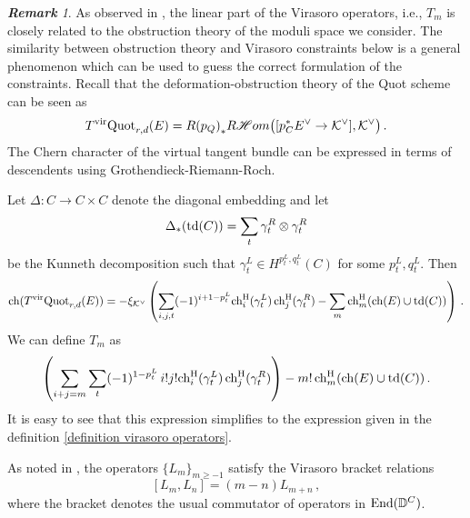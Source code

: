 \documentclass[11pt]{amsart}
\theoremstyle{remark}
\newtheorem{remark}[theorem]{\bf Remark}
\newcommand{\e}{\epsilon}
\newcommand{\ch}{{\rm ch}}
\newcommand{\mf}[1]{\mathfrak{#1}}
\newcommand{\D}{\mathbb{D}}
\newcommand{\K}{\mathcal{K}}
\newcommand{\HOM}[0]{\mathscr{H}om}
\newcommand{\quot}[0]{\textnormal{Quot}}
\newcommand{\vir}[0]{\textnormal{vir}}
\newcommand{\td}[0]{\textnormal{td}}
\newcommand{\End}[0]{\textnormal{End}}
\newcommand{\chh}[0]{\textnormal{ch}^\textnormal{H}}
\numberwithin{theorem}{section}
\begin{document}
\begin{remark}
    As observed in \cite{BLM24}, the linear part of the Virasoro operators, i.e., $T_m$ is closely related to the obstruction theory of the moduli space we consider.
    The similarity between obstruction theory and Virasoro constraints below is a general phenomenon which can be used to guess the correct formulation of the constraints.
    Recall that the deformation-obstruction theory of the Quot scheme can be seen as
    $$T^\vir \quot_{r,d}(E) =  R{(p_{Q})}_* R\HOM
    \big([p_C^*E^\vee \to \K^\vee], \K^\vee\big) \,. $$
    The Chern character of the virtual tangent bundle can be expressed in terms of descendents using Grothendieck-Riemann-Roch.

    Let $\Delta: C \to C \times C$ denote the diagonal embedding
    and let 
    $$\Delta_*(\td(C))= \sum_t \gamma_t^R \otimes \gamma_t^R $$ 
    be the Kunneth decomposition such that $\gamma_t^L \in H^{p_t^L,q_t^L}(C)$ for some $p_t^L,q_t^L$. 
    Then
    \begin{align*}
    \ch(T^\vir \quot_{r,d}(E)) = - \xi_{\K^\vee}
    \left( \sum_{i,j,t} (-1)^{i+1-p_t^L}\chh_i(\gamma_t^L) \, \chh_j(\gamma_t^R)
    - \sum_{m} \chh_m(\ch(E) \cup \td(C)) \right) \,.
    \end{align*}
    We can define $T_m$ as
    $$\left( \sum_{i+j=m} \sum_t (-1)^{1-p_t^L} \, i!j! \chh_i(\gamma_t^L) \, \chh_j(\gamma_t^R) \right)
    - m!\,\chh_m(\ch(E) \cup \td(C))\,.$$
    It is easy to see that this expression simplifies to the expression given in the definition \ref{definition virasoro operators}.
\end{remark}
    As noted in \cite{BLM24}, the operators 
    $\{L_m\}_{m\geqslant-1}$ satisfy the Virasoro bracket relations
    $$ [L_m,L_n] = (m-n) L_{m+n} \,, $$
    where the bracket denotes the usual commutator of operators
    in $\End(\D^C)$.
    
\end{document}
